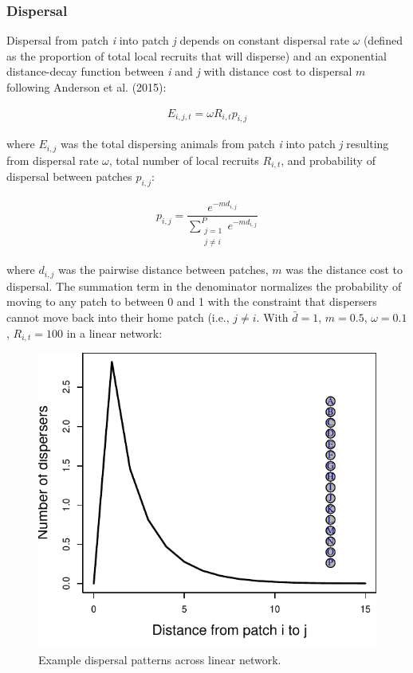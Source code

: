 \documentclass[
]{article}
\begin{document}
\hypertarget{dispersal}{%
\subsubsection{Dispersal}\label{dispersal}}

Dispersal from patch \emph{i} into patch \emph{j} depends on constant
dispersal rate \(\omega\) (defined as the proportion of total local
recruits that will disperse) and an exponential distance-decay function
between \emph{i} and \emph{j} with distance cost to dispersal \(m\)
following Anderson et al. (2015):

\begin{align}
E_{i,j,t}=\omega R_{i,t}p_{i,j}
\end{align}

where \(E_{i,j}\) was the total dispersing animals from patch \emph{i}
into patch \emph{j} resulting from dispersal rate \(\omega\), total
number of local recruits \(R_{i,t}\), and probability of dispersal
between patches \(p_{i,j}\):

\begin{align}
p_{i,j}=\dfrac{e^{-md_{i,j}}}{\sum\limits_{\substack{j=1 \\ j\neq i}}^{P} e^{-md_{i,j}}}
\end{align}

where \(d_{i,j}\) was the pairwise distance between patches, \(m\) was
the distance cost to dispersal. The summation term in the denominator
normalizes the probability of moving to any patch to between 0 and 1
with the constraint that dispersers cannot move back into their home
patch (i.e., \(j\neq i\). With \(\bar{d}= 1\), \(m=0.5\),
\(\omega=0.1\), \(R_{i,t}=100\) in a linear network:

\begin{figure}[H]

{\centering \includegraphics{Managing_for_ecological_surprises_in_metapopulations_files/figure-latex/dispersal-1} 

}

\caption{Example dispersal patterns across linear network.}\label{fig:dispersal}
\end{figure}
\end{document}
